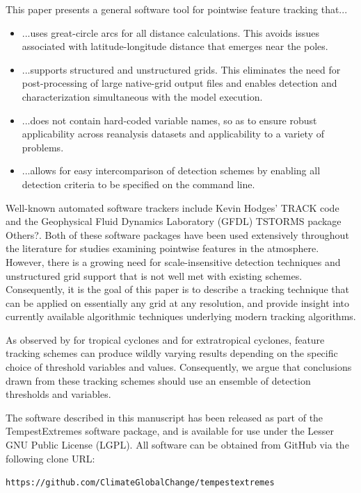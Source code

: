 \documentclass[gmdd, hvmath, online]{copernicus_discussions}
\begin{document}
This paper presents a general software tool for pointwise feature tracking that...
\begin{itemize}
\item[] ...uses great-circle arcs for all distance calculations.  This avoids issues associated with latitude-longitude distance that emerges near the poles.
\item[] ...supports structured and unstructured grids.  This eliminates the need for post-processing of large native-grid output files and enables detection and characterization simultaneous with the model execution.
\item[] ...does not contain hard-coded variable names, so as to ensure robust applicability across reanalysis datasets and applicability to a variety of problems.
\item[] ...allows for easy intercomparison of detection schemes by enabling all detection criteria to be specified on the command line.
\end{itemize}  Well-known automated software trackers include Kevin Hodges' TRACK code \citep{hodges2015track} and the Geophysical Fluid Dynamics Laboratory (GFDL) TSTORMS package \citep{TSTORMS} {\color{red}Others?}.  Both of these software packages have been used extensively throughout the literature for studies examining pointwise features in the atmosphere.  However, there is a growing need for scale-insensitive detection techniques and unstructured grid support that is not well met with existing schemes.  Consequently, it is the goal of this paper is to describe a tracking technique that can be applied on essentially any grid at any resolution, and provide insight into currently available algorithmic techniques underlying modern tracking algorithms.

As observed by \cite{walsh2007objectively} for tropical cyclones and \cite{neu2013imilast} for extratropical cyclones, feature tracking schemes can produce wildly varying results depending on the specific choice of threshold variables and values.  Consequently, we argue that conclusions drawn from these tracking schemes should use an ensemble of detection thresholds and variables.

The software described in this manuscript has been released as part of the TempestExtremes software package, and is available for use under the Lesser GNU Public License (LGPL).  All software can be obtained from GitHub via the following clone URL:
\begin{center}
\texttt{https://github.com/ClimateGlobalChange/tempestextremes}
\end{center} 
\end{document}
